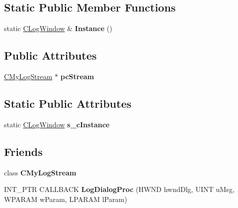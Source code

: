 \subsection*{Static Public Member Functions}
\begin{DoxyCompactItemize}
\item 
\hypertarget{class_c_log_window_a6914caa59c482538b52bb6bc42f54b9a}{static \hyperlink{class_c_log_window}{C\+Log\+Window} \& {\bfseries Instance} ()}\label{class_c_log_window_a6914caa59c482538b52bb6bc42f54b9a}

\end{DoxyCompactItemize}
\subsection*{Public Attributes}
\begin{DoxyCompactItemize}
\item 
\hypertarget{class_c_log_window_ad92a0666fadd9ada1e9dd42864a87f3b}{\hyperlink{class_c_my_log_stream}{C\+My\+Log\+Stream} $\ast$ {\bfseries pc\+Stream}}\label{class_c_log_window_ad92a0666fadd9ada1e9dd42864a87f3b}

\end{DoxyCompactItemize}
\subsection*{Static Public Attributes}
\begin{DoxyCompactItemize}
\item 
\hypertarget{class_c_log_window_a8392f5ea2cf9960eb5b2e0f33d183b8c}{static \hyperlink{class_c_log_window}{C\+Log\+Window} {\bfseries s\+\_\+c\+Instance}}\label{class_c_log_window_a8392f5ea2cf9960eb5b2e0f33d183b8c}

\end{DoxyCompactItemize}
\subsection*{Friends}
\begin{DoxyCompactItemize}
\item 
\hypertarget{class_c_log_window_a5fb4cd89fb0660aab03ca8dde50a866f}{class {\bfseries C\+My\+Log\+Stream}}\label{class_c_log_window_a5fb4cd89fb0660aab03ca8dde50a866f}

\item 
\hypertarget{class_c_log_window_a5b13f3de777e6c66c6157ab54304e435}{I\+N\+T\+\_\+\+P\+T\+R C\+A\+L\+L\+B\+A\+C\+K {\bfseries Log\+Dialog\+Proc} (H\+W\+N\+D hwnd\+Dlg, U\+I\+N\+T u\+Msg, W\+P\+A\+R\+A\+M w\+Param, L\+P\+A\+R\+A\+M l\+Param)}\label{class_c_log_window_a5b13f3de777e6c66c6157ab54304e435}

\end{DoxyCompactItemize}


